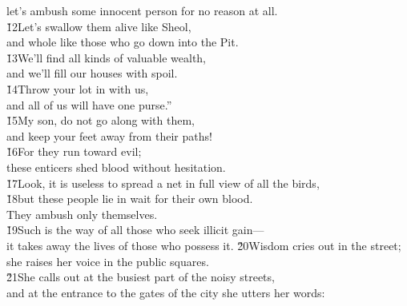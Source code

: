 \begin{poetry}
\poemlll       let's ambush some innocent person for no reason at all. \\
\poeml \v{12}Let's swallow them alive like Sheol, \\
\poemll    and whole like those who go down into the Pit. \\
\poeml \v{13}We'll find all kinds of valuable wealth, \\
\poemll    and we'll fill our houses with spoil. \\
\poeml \v{14}Throw your lot in with us, \\
\poemll    and all of us will have one purse.'' \\
\poeml \v{15}My son, do not go along with them, \\
\poemll    and keep your feet away from their paths! \\
\poeml \v{16}For they run toward evil; \\
\poemll    these enticers shed blood without hesitation. \\
\poeml \v{17}Look, it is useless to spread a net in full view of all the birds, \\
\poeml \v{18}but these people lie in wait for their own blood. \\
\poemlll       They ambush only themselves. \\
\poeml \v{19}Such is the way of all those who seek illicit gain--- \\
\poemll    it takes away the lives of those who possess it.
\poeml \v{20}Wisdom cries out in the street; \\
\poemll    she raises her voice in the public squares. \\
\poeml \v{21}She calls out at the busiest part of the noisy streets, \\
\poemll    and at the entrance to the gates of the city she utters her words: \\

\end{poetry}
